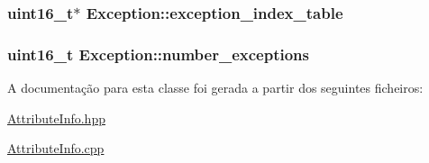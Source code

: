 \subsubsection[{\texorpdfstring{exception\+\_\+index\+\_\+table}{exception_index_table}}]{\setlength{\rightskip}{0pt plus 5cm}uint16\+\_\+t$\ast$ Exception\+::exception\+\_\+index\+\_\+table}\hypertarget{class_exception_a496a578392dba7830e8efcc36a27fe27}{}\label{class_exception_a496a578392dba7830e8efcc36a27fe27}
\subsubsection[{\texorpdfstring{number\+\_\+exceptions}{number_exceptions}}]{\setlength{\rightskip}{0pt plus 5cm}uint16\+\_\+t Exception\+::number\+\_\+exceptions}\hypertarget{class_exception_add71629097c0b5242c01d1d0d5404d3d}{}\label{class_exception_add71629097c0b5242c01d1d0d5404d3d}


A documentação para esta classe foi gerada a partir dos seguintes ficheiros\+:\begin{DoxyCompactItemize}
\item 
\hyperlink{_attribute_info_8hpp}{Attribute\+Info.\+hpp}\item 
\hyperlink{_attribute_info_8cpp}{Attribute\+Info.\+cpp}\end{DoxyCompactItemize}
